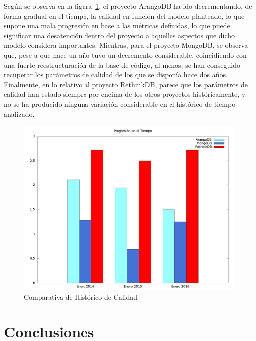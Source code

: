 \documentclass[11pt]{article}
\begin{document}
Según se observa en la figura~\ref{fig:quality_progression}, el proyecto ArangoDB ha ido decrementando, de forma gradual en el tiempo, la calidad en función del modelo planteado, lo que supone una mala progresión en base a las métricas definidas, lo que puede significar una desatención dentro del proyecto a aquellos aspectos que dicho modelo considera importantes. Mientras, para el proyecto MongoDB, se observa que, pese a que hace un año tuvo un decremento considerable, coincidiendo con una fuerte reestructuración de la base de código, al menos, se han conseguido recuperar los parámetros de calidad de los que se disponía hace dos años. Finalmente, en lo relativo al proyecto RethinkDB, parece que los parámetros de calidad han estado siempre por encima de los otros proyectos históricamente, y no se ha producido ninguna variación considerable en el histórico de tiempo analizado.

\begin{center}
 \begin{figure}[H]
 \begin{center}
   \includegraphics[width=16cm]{img/quality_progress.png}
   \caption{Comparativa de Histórico de Calidad}
   \label{fig:quality_progression}
 \end{center}
 \end{figure}
\end{center}


\section{Conclusiones}
\label{sec:conclussions}
\end{document}
